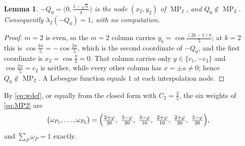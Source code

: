 \documentclass[11pt]{amsart}
\newtheorem{lemma}[theorem]{Lemma}
\DeclareMathOperator{\MP}{MP}
\newcommand{\ph}{\varphi}
\begin{document}
\begin{lemma}\label{lem:pos}
$-Q_0=\bigl(0,\frac{1-\sqrt5}4\bigr)$ is the node $(x_2,y_2)$ of $\MP_2$, and
$Q_0\notin\MP_2$. Consequently $\lambda_2(-Q_0)=1$, with no computation.
\end{lemma}

\begin{proof}
$m=2$ is even, so the $m=2$ column carries $y_k=\cos\frac{(2k-1)\pi}5$; at
$k=2$ this is $\cos\frac{3\pi}5=-\cos\frac{2\pi}5$, which is the second
coordinate of $-Q_0$, and the first coordinate is $x_2=\cos\frac\pi2=0$. That
column carries only $y\in\{c_1,-c_2\}$ and $\cos\frac{2\pi}5=c_2$ is neither,
while every other column has $x=\pm a\ne0$; hence $Q_0\notin\MP_2$. A Lebesgue
function equals $1$ at each interpolation node.
\end{proof}

By \eqref{eq:wdef}, or equally from the closed form with $C_2=\frac25$, the six
weights of \eqref{eq:MP2} are
\begin{equation}\label{eq:weights}
  \bigl(\omega_{P_1},\dots,\omega_{P_6}\bigr)
  =\Bigl(
   \tfrac{2+\ph}{20},\ \tfrac{3-\ph}{20},\ \tfrac{3-\ph}{10},\
   \tfrac{2+\ph}{10},\ \tfrac{2+\ph}{20},\ \tfrac{3-\ph}{20}
  \Bigr),
\end{equation}
and $\sum_P\omega_P=1$ exactly.
\end{document}
